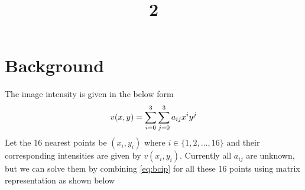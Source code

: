 \documentclass[a4paper, landscape]{article}
\title{2}
\date{}
\begin{document}
\maketitle
\section{Background}
The image intensity is given in the below form
\begin{equation}{\label{eq:bcip}}
		v(x,y)= \sum_{i=0}^{3}\sum_{j=0}^{3} a_{ij}x^i y^j
\end{equation}
Let the 16 nearest points be $(x_i, y_i)$ where $i\in\{1,2,\dots,16\}$ and their corresponding intensities are given by $v(x_i, y_i)$.
Currently all $a_{ij}$ are unknown, but we can solve them by combining \ref{eq:bcip} for all these 16 points using matrix representation as shown below 
\end{document}
